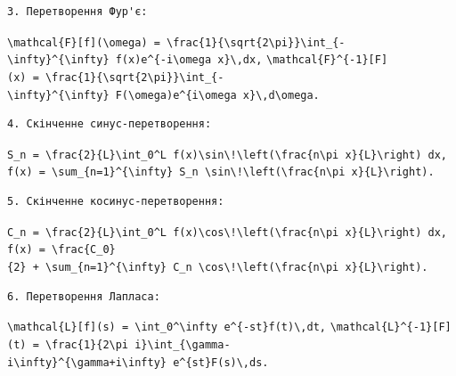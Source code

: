 \documentclass[
  ukrainian,
]{article}
\begin{document}
\begin{verbatim}
3. Перетворення Фур'є:
\end{verbatim}

\texttt{\textbackslash{}mathcal\{F\}{[}f{]}(\textbackslash{}omega)\ =\ \textbackslash{}frac\{1\}\{\textbackslash{}sqrt\{2\textbackslash{}pi\}\}\textbackslash{}int\_\{-\textbackslash{}infty\}\^{}\{\textbackslash{}infty\}\ f(x)e\^{}\{-i\textbackslash{}omega\ x\}\textbackslash{},dx,}
\texttt{\textbackslash{}mathcal\{F\}\^{}\{-1\}{[}F{]}(x)\ =\ \textbackslash{}frac\{1\}\{\textbackslash{}sqrt\{2\textbackslash{}pi\}\}\textbackslash{}int\_\{-\textbackslash{}infty\}\^{}\{\textbackslash{}infty\}\ F(\textbackslash{}omega)e\^{}\{i\textbackslash{}omega\ x\}\textbackslash{},d\textbackslash{}omega.}

\begin{verbatim}
4. Скінченне синус-перетворення:
\end{verbatim}

\texttt{S\_n\ =\ \textbackslash{}frac\{2\}\{L\}\textbackslash{}int\_0\^{}L\ f(x)\textbackslash{}sin\textbackslash{}!\textbackslash{}left(\textbackslash{}frac\{n\textbackslash{}pi\ x\}\{L\}\textbackslash{}right)\ dx,}
\texttt{f(x)\ =\ \textbackslash{}sum\_\{n=1\}\^{}\{\textbackslash{}infty\}\ S\_n\ \textbackslash{}sin\textbackslash{}!\textbackslash{}left(\textbackslash{}frac\{n\textbackslash{}pi\ x\}\{L\}\textbackslash{}right).}

\begin{verbatim}
5. Скінченне косинус-перетворення:
\end{verbatim}

\texttt{C\_n\ =\ \textbackslash{}frac\{2\}\{L\}\textbackslash{}int\_0\^{}L\ f(x)\textbackslash{}cos\textbackslash{}!\textbackslash{}left(\textbackslash{}frac\{n\textbackslash{}pi\ x\}\{L\}\textbackslash{}right)\ dx,}
\texttt{f(x)\ =\ \textbackslash{}frac\{C\_0\}\{2\}\ +\ \textbackslash{}sum\_\{n=1\}\^{}\{\textbackslash{}infty\}\ C\_n\ \textbackslash{}cos\textbackslash{}!\textbackslash{}left(\textbackslash{}frac\{n\textbackslash{}pi\ x\}\{L\}\textbackslash{}right).}

\begin{verbatim}
6. Перетворення Лапласа:
\end{verbatim}

\texttt{\textbackslash{}mathcal\{L\}{[}f{]}(s)\ =\ \textbackslash{}int\_0\^{}\textbackslash{}infty\ e\^{}\{-st\}f(t)\textbackslash{},dt,}
\texttt{\textbackslash{}mathcal\{L\}\^{}\{-1\}{[}F{]}(t)\ =\ \textbackslash{}frac\{1\}\{2\textbackslash{}pi\ i\}\textbackslash{}int\_\{\textbackslash{}gamma-i\textbackslash{}infty\}\^{}\{\textbackslash{}gamma+i\textbackslash{}infty\}\ e\^{}\{st\}F(s)\textbackslash{},ds.}
\end{document}
